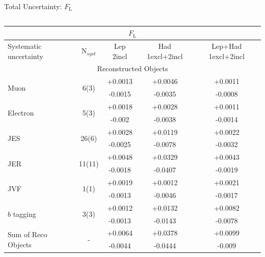 \documentclass{beamer}
\newcommand*{\fl}{\ensuremath{F_{\text{L}}}\xspace}
\newcommand*{\bt}{\ensuremath{b}\xspace}
\begin{document}
{\begin{frame}{Total Uncertainty: \fl}
\begin{columns}
\begin{table}[h!]
        \begin{tabular}{lcccc}
          \hline\hline
          \multicolumn{5}{c}{\fl}\\
          \hline
          Systematic uncertainty & N$_{syst}$ & Lep 2incl & Had 1excl+2incl & Lep+Had 1excl+2incl \\\hline
          \multicolumn{5}{c}{Reconstructed Objects} \\\hline
          \multirow{2}{*}{Muon} & \multirow{2}{*}{6(3)} & +0.0013 & +0.0046 & +0.0011\\
                                 &                       & -0.0015 & -0.0035 & -0.0008\\\hline
          \multirow{2}{*}{Electron} & \multirow{2}{*}{5(3)} & +0.0018 & +0.0028 & +0.0011\\
                                 &                       & -0.002 & -0.0038 & -0.0014\\\hline
          \multirow{2}{*}{JES} & \multirow{2}{*}{26(6)} & +0.0028 & +0.0119 & +0.0022\\
                                 &                       & -0.0025 & -0.0078 & -0.0032\\\hline
          \multirow{2}{*}{JER} & \multirow{2}{*}{11(11)} & +0.0048 & +0.0329 & +0.0043\\
                                 &                       & -0.0018 & -0.0407 & -0.0019\\\hline
          \multirow{2}{*}{JVF} & \multirow{2}{*}{1(1)} & +0.0019 & +0.0012 & +0.0021\\
                                 &                       & -0.0013 & -0.0046 & -0.0017\\\hline
          \multirow{2}{*}{\bt tagging} & \multirow{2}{*}{3(3)} & +0.0012 & +0.0132 & +0.0082\\
                                 &                       & -0.0013 & -0.0143 & -0.0078\\\hline
          
          \hline\hline
          \multirow{2}{*}{Sum of Reco Objects} & \multirow{2}{*}{-} & +0.0064 & +0.0378 & +0.0099\\
                                 &                       & -0.0044 & -0.0444 & -0.009\\\hline
          

\end{tabular}
\end{table}
\end{columns}
\end{frame}}
\end{document}

